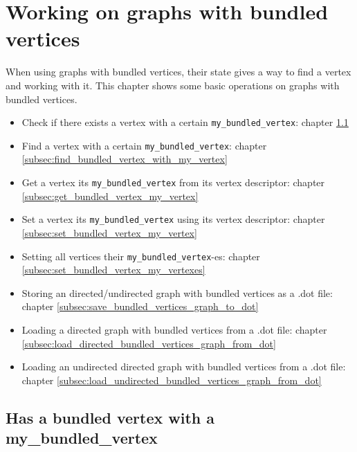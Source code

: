 \chapter{Working on graphs with bundled vertices}
\label{sec:Working-on-graphs-with-bundled-vertices}

When using graphs with bundled vertices, their state gives a way to find
a vertex and working with it.
This chapter shows some basic operations on graphs with bundled vertices.

\begin{itemize}
  \item Check if there exists a vertex with a certain \verb;my_bundled_vertex;: 
    chapter \ref{subsec:has_bundled_vertex_with_my_vertex}
  \item Find a vertex with a certain \verb;my_bundled_vertex;: 
    chapter \ref{subsec:find_bundled_vertex_with_my_vertex}
  \item Get a vertex its \verb;my_bundled_vertex; from its vertex descriptor: 
    chapter \ref{subsec:get_bundled_vertex_my_vertex}
  \item Set a vertex its \verb;my_bundled_vertex; using its vertex descriptor: 
    chapter \ref{subsec:set_bundled_vertex_my_vertex}
  \item Setting all vertices their \verb;my_bundled_vertex;-es: 
    chapter \ref{subsec:set_bundled_vertex_my_vertexes}
  \item Storing an directed/undirected graph with bundled vertices as a .dot file: 
    chapter \ref{subsec:save_bundled_vertices_graph_to_dot}
  \item Loading a directed graph with bundled vertices from a .dot file: 
    chapter \ref{subsec:load_directed_bundled_vertices_graph_from_dot}
  \item Loading an undirected directed graph with bundled vertices from a .dot file:
    chapter \ref{subsec:load_undirected_bundled_vertices_graph_from_dot}
\end{itemize}

\section{Has a bundled vertex with a my\_bundled\_vertex}
\label{subsec:has_bundled_vertex_with_my_vertex}

